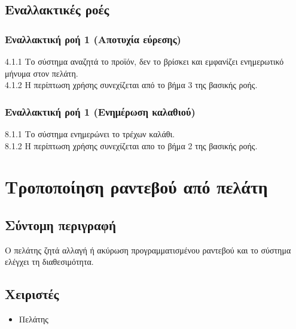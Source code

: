 \documentclass[12pt,a4paper,twoside]{book}
\begin{document}
\subsection{Εναλλακτικές ροές}

\subsubsection*{Εναλλακτική ροή 1 (Αποτυχία εύρεσης)}
4.1.1 Το σύστημα αναζητά το προϊόν, δεν το βρίσκει και εμφανίζει ενημερωτικό μήνυμα στον πελάτη.\\
\hspace*{\parindent}4.1.2 Η περίπτωση χρήσης συνεχίζεται από το βήμα 3 της βασικής ροής.

\subsubsection*{Εναλλακτική ροή 1 (Ενημέρωση καλαθιού)}
8.1.1 Το σύστημα ενημερώνει το τρέχων καλάθι.\\
\hspace*{\parindent}8.1.2 Η περίπτωση χρήσης συνεχίζεται απο το βήμα 2 της βασικής ροής.

\section{Τροποποίηση ραντεβού από πελάτη}

\subsection{Σύντομη περιγραφή}
Ο πελάτης ζητά αλλαγή ή ακύρωση προγραμματισμένου ραντεβού και το σύστημα ελέγχει τη διαθεσιμότητα.

\subsection{Χειριστές}
\begin{itemize}
    \item Πελάτης
\end{itemize}
\end{document}
